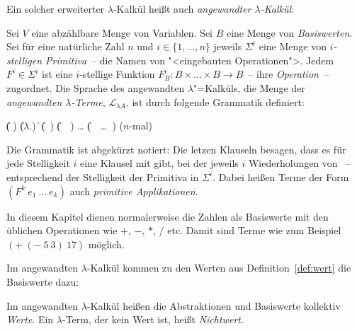 Ein solcher erweiterter $\lambda$-Kalkül heißt auch
\textit{angewandter $\lambda$-Kalkül}:

\begin{definition}\label{def:lambda-angewandt}
  
  Sei $V$ eine abzählbare Menge von Variablen.  Sei $B$ eine Menge von
  \textit{Basiswerten}.  Sei für eine natürliche
  Zahl $n$ und $i \in \{1, \ldots, n\}$ jeweils $\Sigma^i$ eine Menge
  von \textit{$i$-stelligen Primitiva}~-- die Namen
  von "<eingebauten Operationen">.  Jedem $F^i\in\Sigma^i$ ist eine
  $i$-stellige Funktion $F_B^i: B\times\ldots\times B \rightarrow
  B$~-- ihre \textit{Operation}~--
  zugordnet.  Die Sprache des angewandten $\lambda$"=Kalküls, die
  Menge der \textit{angewandten $\lambda$-Terme},
  $\mathcal{L}_{\lambda{}A}$, ist
  durch folgende Grammatik definiert:
  \begin{grammar}
     \: 
    \> \| ( )
    \> \| ($\lambda$.)
    \> \| 
    \> \| (~)
    \> \| (~~)
    \> \ldots
    \> \| (~~\ldots~) \quad \textrm{($n$-mal)}
  \end{grammar}
  Die Grammatik ist abgekürzt notiert: Die letzen Klauseln besagen,
  dass es für jede Stelligkeit $i$ eine Klausel mit  gibt,
  bei der jeweils $i$ Wiederholungen von
  ~-- entsprechend der Stelligkeit
  der Primitiva in $\Sigma^i$.
Dabei heißen Terme der Form $(F^k~e_1~\ldots~e_k)$ auch
\textit{primitive Applikationen}.
\end{definition}
%
In diesem Kapitel dienen normalerweise die Zahlen als Basiswerte mit
den üblichen Operationen wie $+$, $-$, $\ast$, $/$ etc.  Damit sind
Terme wie zum Beispiel $(+~(-~5~3)~17)$ möglich.

Im angewandten $\lambda$-Kalkül kommen zu den Werten aus
Definition~\ref{def:wert} die Basiswerte dazu:
%
\begin{definition}\label{def:wert-angewandt}
  Im angewandten $\lambda$-Kalkül heißen die Abstraktionen und
  Basiswerte kollektiv \textit{Werte}.  Ein $\lambda$-Term, der kein
  Wert ist, heißt \textit{Nichtwert}.
\end{definition}

